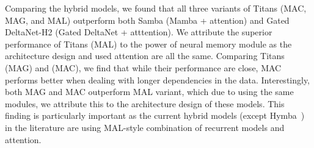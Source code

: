 \documentclass{article}
\newcommand{\citep}{\parencite}
\begin{document}
Comparing the hybrid models, we found that all three variants of Titans (MAC, MAG, and MAL) outperform both Samba (Mamba + attention) and Gated DeltaNet-H2 (Gated DeltaNet + atttention). We attribute the superior performance of Titans (MAL) to the power of neural memory module as the architecture design and used attention are all the same. Comparing Titans (MAG) and (MAC), we find that while their performance are close, MAC performs better when dealing with longer dependencies in the data. Interestingly, both MAG and MAC outperform MAL variant, which due to using the same modules, we attribute this to the architecture design of these models. This finding is particularly important as the current hybrid models (except Hymba~\citep{dong2024hymba}) in the literature are using MAL-style combination of recurrent models and attention. 

\begin{table}
    \centering
    \caption{Performance of Titans and baselines on S-NIAH task from RULER benchmark. The best results among {\colorbox{myblue}{simple}} and {\colorbox{mygreen}{hybrid}} models are highlighted.}
    \label{tab:hystack}
\end{table}
\end{document}

